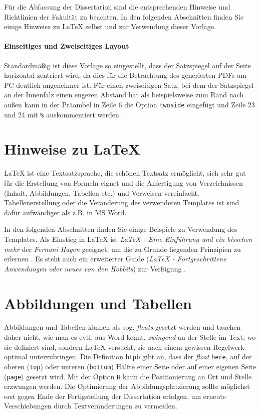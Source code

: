 \documentclass{scrreprt}
\begin{document}
Für die Abfassung der Dissertation sind die entsprechenden Hinweise und Richtlinien der Fakultät zu beachten. In den folgenden Abschnitten finden Sie einige Hinweise zu LaTeX selbst und zur Verwendung dieser Vorlage. 

\paragraph{Einseitiges und Zweiseitiges Layout}
Standardmäßig ist diese Vorlage so eingestellt, dass der Satzspiegel auf der Seite horizontal zentriert wird, da dies für die Betrachtung des generierten PDFs am PC deutlich angenehmer ist. Für einen zweiseitigen Satz, bei dem der Satzspiegel an der Innenfalz einen engeren Abstand hat als beispielsweise zum Rand nach außen kann in der Präambel in Zeile 6 die Option \verb|twoside| eingefügt und Zeile 23 und 24 mit \verb|%| auskommentiert werden. 

\section{Hinweise zu \LaTeX}
\par{\LaTeX} ist eine Textsatzsprache, die schönen Textsatz ermöglicht, sich sehr gut für die Erstellung von Formeln eignet und die Anfertigung von Verzeichnissen (Inhalt, Abbildungen, Tabellen etc.) und Verweisen vereinfacht. Tabellenerstellung oder die Veränderung des verwendeten Templates ist sind dafür aufwändiger als z.B. in MS Word. 

In den folgenden Abschnitten finden Sie einige Beispiele zu Verwendung des Templates. Als Einstieg in LaTeX  ist  \textit{LaTeX - Eine Einführung und ein bisschen mehr} der \textit{Fernuni Hagen} geeignet, um die zu Grunde liegenden Prinzipien zu erlernen \cite{LaTeX_Guide_1}. Es steht auch ein erweiterter Guide (\textit{LaTeX - Fortgeschrittene Anwendungen oder neues von den Hobbits}) zur Verfügung \cite{LaTeX_Guide_2}. 

\section{Abbildungen und Tabellen}

Abbildungen und Tabellen können als sog. \textit{floats} gesetzt werden und tauchen daher nicht, wie man es evtl. aus Word kennt, \textit{zwingend} an der Stelle im Text, wo sie definiert sind, sondern LaTeX versucht, sie nach einem gewissen Regelwerk optimal unterzubringen. Die Definition \verb|htpb| gibt an, dass der \textit{float} \verb|here|, auf der oberen (\verb|top|) oder unteren (\verb|bottom|) Hälfte einer Seite oder auf einer eigenen Seite (\verb|page|) gesetzt wird. Mit der Option \verb|H| kann die Positionierung an Ort und Stelle erzwungen werden. Die Optimierung der Abbildungsplatzierung sollte möglichst erst gegen Ende der Fertigstellung der Dissertation erfolgen, um erneute Verschiebungen durch Textveränderungen zu vermeiden. 
\end{document}
